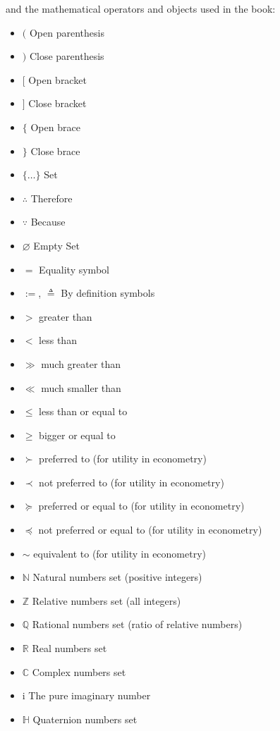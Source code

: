 \documentclass[12pt,a4paper,twoside,openright]{report}
\newcounter{def}
\theoremstyle{definition}
\theoremstyle{itexmp}
\numberwithin{equation}{section}
\begin{document}
	and the mathematical operators and objects used in the book:
	\begin{itemize}[label={},leftmargin=0.5cm]
		\setlength{\itemsep}{1pt}
  		\item $($ Open parenthesis
  		\item $)$ Close parenthesis
  		\item $[$ Open bracket
  		\item $]$ Close bracket
  		\item $\{$ Open brace
  		\item $\}$ Close brace
  		\item $\{\ldots\}$ Set
  		\item $\therefore$ Therefore
  		\item $\because$ Because
	 	\item $\varnothing$ Empty Set
	 	\item $=$ Equality symbol
	 	\item $:=$, $\triangleq$ By definition symbols
	 	\item $>$ greater than
	 	\item $<$ less than
	 	\item $\gg$ much greater than
	 	\item $\ll$ much smaller than
	 	\item $\leq$ less than or equal to
	 	\item $\geq$ bigger or equal to
	 	\item $\succ$ preferred to (for utility in econometry)
	 	\item $\prec$ not preferred to (for utility in econometry)
	 	\item $\succeq$ preferred or equal to (for utility in econometry)
	 	\item $\preceq$ not preferred or equal to (for utility in econometry)
	 	\item $\sim$ equivalent to (for utility in econometry)
	 	\item $\mathbb{N}$ Natural numbers set (positive integers)
	 	\item $\mathbb{Z}$ Relative numbers set (all integers)
	 	\item $\mathbb{Q}$ Rational numbers set (ratio of relative numbers)
	 	\item $\mathbb{R}$ Real numbers set
	 	\item $\mathbb{C}$ Complex numbers set
	 	\item $\mathrm{i}$ The pure imaginary number
	 	\item $\mathbb{H}$ Quaternion numbers set

\end{itemize}
\end{document}
